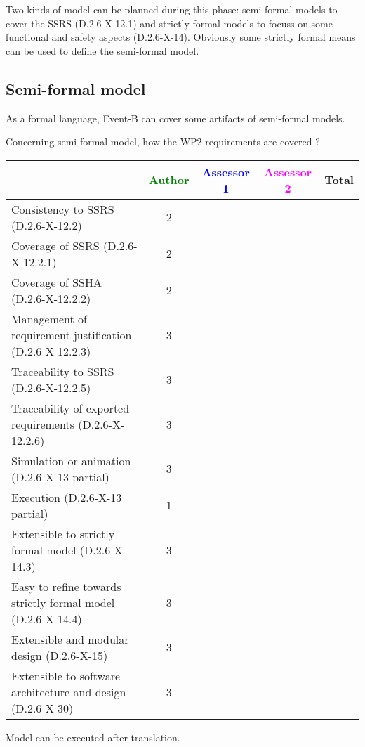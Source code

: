 Two kinds of model can be planned during this phase: semi-formal models to  cover the SSRS (D.2.6-X-12.1) and strictly formal  models to  focuss on some functional and safety aspects (D.2.6-X-14).  Obviously some strictly  formal means can be used to define the semi-formal  model.

\subsection{Semi-formal model}


\begin{author_comment}
As a formal language, Event-B  can cover some artifacts of semi-formal models.
\end{author_comment}

Concerning semi-formal model, how the WP2 requirements are covered ?

\begin{tabular}{|l | c | c | c | c|}
\hline
& \textcolor{green}{Author} & \textcolor{blue}{Assessor 1} & \textcolor{magenta}{Assessor 2} & Total \\
\hline 
Consistency to SSRS (D.2.6-X-12.2) & 2 & & &  \\
\hline
Coverage of SSRS (D.2.6-X-12.2.1)  & 2 & & &  \\
\hline
Coverage of SSHA (D.2.6-X-12.2.2)  & 2 & & &  \\
\hline
Management of requirement justification (D.2.6-X-12.2.3)  & 3 & & &  \\
\hline
Traceability to  SSRS (D.2.6-X-12.2.5)  & 3 & & &  \\
\hline
Traceability of exported requirements (D.2.6-X-12.2.6)  & 3 & & &  \\
\hline
Simulation or animation (D.2.6-X-13 partial)  & 3 & & &  \\
\hline
Execution (D.2.6-X-13 partial)  & 1 & & &  \\
\hline
Extensible to strictly formal model (D.2.6-X-14.3) & 3 & & &  \\
\hline
Easy to  refine towards strictly formal model (D.2.6-X-14.4) & 3 & & &  \\
\hline
Extensible and modular design (D.2.6-X-15)  & 3 & & &  \\
\hline
Extensible to software architecture and design (D.2.6-X-30)   & 3 & & &  \\
\hline
\end{tabular}


\begin{author_comment}
Model can be executed after translation.
\end{author_comment}

